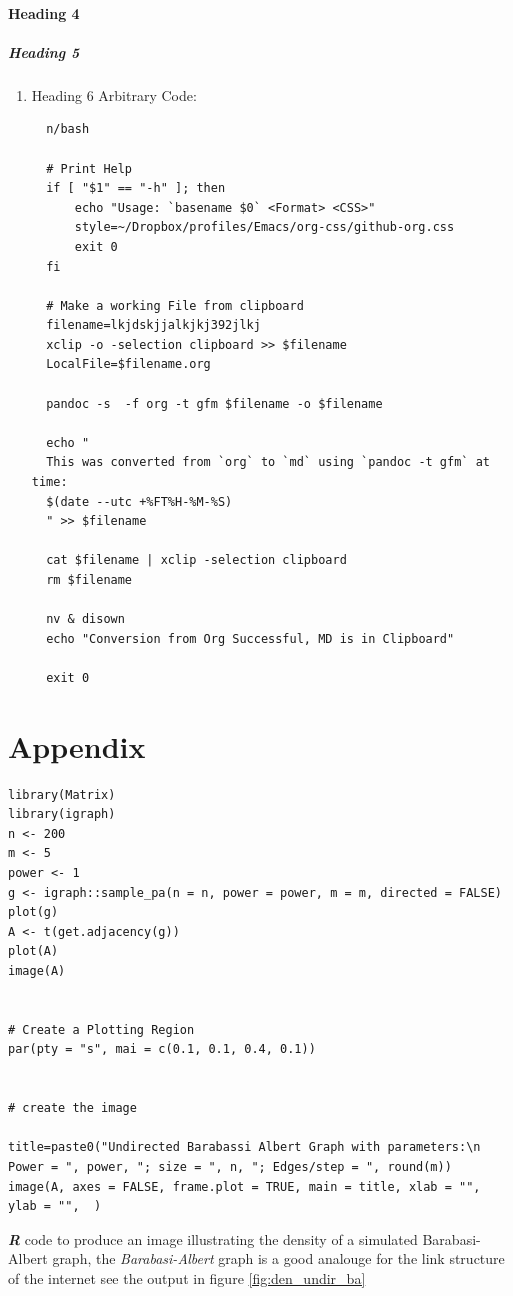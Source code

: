 \documentclass[11pt]{article}
\begin{document}
\paragraph{Heading 4}
\label{heading-4}
\subparagraph{Heading 5}
\label{heading-5}
\begin{enumerate}
\item Heading 6
\label{heading-6}
Arbitrary Code:

\begin{verbatim}
  n/bash

  # Print Help
  if [ "$1" == "-h" ]; then
      echo "Usage: `basename $0` <Format> <CSS>"
      style=~/Dropbox/profiles/Emacs/org-css/github-org.css
      exit 0
  fi

  # Make a working File from clipboard
  filename=lkjdskjjalkjkj392jlkj
  xclip -o -selection clipboard >> $filename
  LocalFile=$filename.org

  pandoc -s  -f org -t gfm $filename -o $filename

  echo "
  This was converted from `org` to `md` using `pandoc -t gfm` at time:
  $(date --utc +%FT%H-%M-%S)
  " >> $filename

  cat $filename | xclip -selection clipboard
  rm $filename

  nv & disown
  echo "Conversion from Org Successful, MD is in Clipboard"

  exit 0
\end{verbatim}
\end{enumerate}
\section{Appendix}
\label{sec:orgd22d506}

\begin{listing}[htbp]
\begin{verbatim}
library(Matrix)
library(igraph)
n <- 200
m <- 5
power <- 1
g <- igraph::sample_pa(n = n, power = power, m = m, directed = FALSE)
plot(g)
A <- t(get.adjacency(g))
plot(A)
image(A)


# Create a Plotting Region
par(pty = "s", mai = c(0.1, 0.1, 0.4, 0.1))


# create the image

title=paste0("Undirected Barabassi Albert Graph with parameters:\n Power = ", power, "; size = ", n, "; Edges/step = ", round(m))
image(A, axes = FALSE, frame.plot = TRUE, main = title, xlab = "", ylab = "",  )
\end{verbatim}
\caption{\label{r-den_undir_ba}\textbf{\emph{R}} code to produce an image illustrating the density of a simulated Barabasi-Albert graph, the \emph{Barabasi-Albert} graph is a good analouge for the link structure of the internet \cite{langvilleGooglePageRankScience2012,barabasiPhysicsWeb2001,barabasiScalefreeCharacteristicsRandom2000} see the output in figure \ref{fig:den_undir_ba}}
\end{listing}
\end{document}
